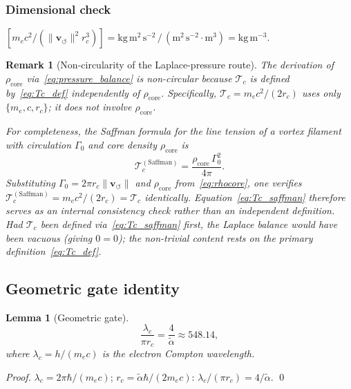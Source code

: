 \documentclass[aps,pra,preprint,longbibliography,nofootinbib]{revtex4-2}
\newtheorem{lemma}{Lemma}
\newtheorem{remark}{Remark}
\newcommand{\vnorm}{\lVert\mathbf{v}_{\!\boldsymbol{\circlearrowleft}}\rVert} %
\newcommand{\rhocore}{\rho_{\mathrm{core}}}      %
\newcommand{\rc}{r_c}                            %
\newcommand{\lc}{\lambda_c}                      %
\newcommand{\Tc}{\mathcal{T}_c}                  %
\newcommand{\Gz}{\Gamma_0}                       %
\begin{document}
\subsubsection*{Dimensional check}
$[m_e c^2/(\vnorm^2\rc^3)]
= \mathrm{kg\,m^2\,s^{-2}\,/\,(m^2\,s^{-2}\cdot m^3)}
= \mathrm{kg\,m^{-3}}$. \checkmark

\begin{remark}[Non-circularity of the Laplace-pressure route]
\label{rem:noncircular}
The derivation of $\rhocore$ via~\eqref{eq:pressure_balance} is
non-circular because $\Tc$ is defined by~\eqref{eq:Tc_def}
independently of $\rhocore$.
Specifically, $\Tc = m_ec^2/(2\rc)$ uses only $\{m_e, c, \rc\}$;
it does not involve $\rhocore$.

For completeness, the Saffman formula for the line tension of a
vortex filament with circulation $\Gz$ and core density
$\rhocore$ is~\cite{Saffman1992}
\begin{equation}
  \Tc^{\mathrm{(Saffman)}} = \frac{\rhocore\,\Gz^2}{4\pi}.
  \label{eq:Tc_saffman}
\end{equation}
Substituting $\Gz = 2\pi\rc\vnorm$ and $\rhocore$
from~\eqref{eq:rhocore}, one verifies
$\Tc^{\mathrm{(Saffman)}} = m_ec^2/(2\rc) = \Tc$ identically.
Equation~\eqref{eq:Tc_saffman} therefore serves as an internal
consistency check rather than an independent definition.
Had $\Tc$ been defined via~\eqref{eq:Tc_saffman} first,
the Laplace balance would have been vacuous (giving $0 = 0$);
the non-trivial content rests on the primary
definition~\eqref{eq:Tc_def}.
\end{remark}

\subsection{Geometric gate identity}
\label{sec:gate}

\begin{lemma}[Geometric gate]
\label{lem:gate}
\begin{equation}
  \frac{\lc}{\pi\rc} = \frac{4}{\tilde\alpha} \approx 548.14,
  \label{eq:gate}
\end{equation}
where $\lc = h/(m_ec)$ is the electron Compton wavelength.
\end{lemma}

\begin{proof}
$\lc = 2\pi\hbar/(m_ec)$; $\rc = \tilde\alpha\hbar/(2m_ec)$:
$\lc/(\pi\rc) = 4/\tilde\alpha$. \qed
\end{proof}
\end{document}
